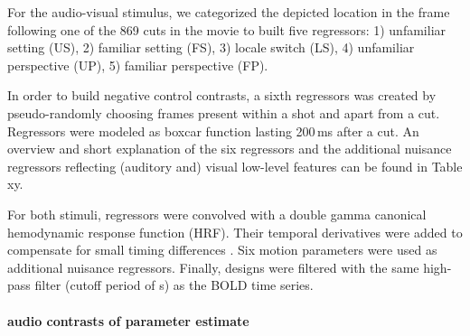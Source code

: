 \documentclass[english]{article}
\begin{document}
For the audio-visual stimulus, we categorized the depicted location in the frame following one of the 869 cuts in the movie to built five regressors: 1) unfamiliar setting (US), 2) familiar setting (FS), 3) locale switch (LS), 4) unfamiliar perspective (UP), 5) familiar perspective (FP).

In order to build negative control contrasts, a sixth regressors was created by pseudo-randomly choosing frames present within a shot and apart from a cut. Regressors were modeled as boxcar function lasting 200\,ms after a cut.
An overview and short explanation of the six regressors and the additional nuisance regressors reflecting (auditory and) visual low-level features can be found in Table xy.

For both stimuli, regressors were convolved with a double gamma canonical hemodynamic response function (HRF).
Their temporal derivatives were added to compensate for small timing differences \citep{friston1998event}.
Six motion parameters were used as additional nuisance regressors. Finally, designs were filtered with the same high-pass filter (cutoff period of \unit[150]{s}) as the BOLD time series.



\paragraph{audio contrasts of parameter estimate}
\end{document}
